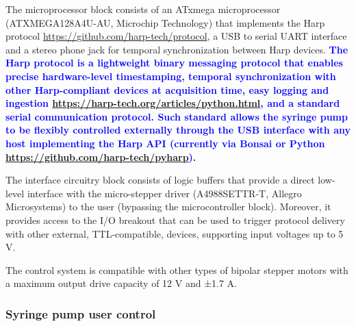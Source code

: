 The microprocessor block consists of an ATxmega microprocessor (ATXMEGA128A4U-AU, Microchip Technology) that implements the Harp protocol \url{https://github.com/harp-tech/protocol}, a USB to serial UART interface and a stereo phone jack for temporal synchronization between Harp devices. \textcolor{blue}{\textbf{The Harp protocol is a lightweight binary messaging protocol that enables precise hardware-level timestamping, temporal synchronization with other Harp-compliant devices at acquisition time, easy logging and ingestion \url{https://harp-tech.org/articles/python.html}, and a standard serial communication protocol. Such standard allows the syringe pump to be flexibly controlled externally through the USB interface with any host implementing the Harp API (currently via Bonsai \citep{Lopes2015} or Python \url{https://github.com/harp-tech/pyharp}).}}

The interface circuitry block consists of logic buffers that provide a direct low-level interface with the micro-stepper driver (A4988SETTR-T, Allegro Microsystems) to the user (bypassing the microcontroller block). Moreover, it provides access to the I/O breakout that can be used to trigger protocol delivery with other external, TTL-compatible, devices, supporting input voltages up to 5 V. 

The control system is compatible with other types of bipolar stepper motors with a maximum output drive capacity of 12 V and ±1.7 A.

\subsubsection*{Syringe pump user control}

